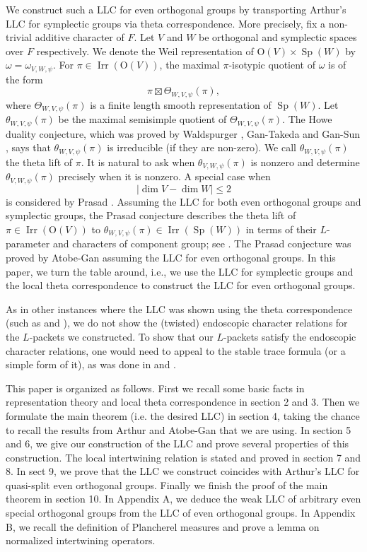 \documentclass[article]{article}
\numberwithin{equation}{section}
\theoremstyle{definition}
\DeclareMathOperator{\SP}{Sp}
\DeclareMathOperator{\Irr}{Irr}
\begin{document}
We construct such a LLC for even orthogonal groups by transporting Arthur's LLC for symplectic groups via theta correspondence. More precisely, fix a non-trivial additive character of $F$. Let $V$ and $W$ be orthogonal and symplectic spaces over $F$ respectively. We denote the Weil representation of $\mathrm O(V)\times \SP(W)$ by $\omega=\omega_{V,W,\psi}$. For $\pi\in 
\Irr(\mathrm O(V))$, the maximal $\pi$-isotypic quotient of $\omega$ is of the form
$$\pi \boxtimes \Theta_{W,V,\psi}(\pi),$$
where $\Theta_{W,V,\psi}(\pi)$ is a finite length smooth representation of $\SP(W)$. Let $\theta_{W,V, \psi}(\pi)$ be the maximal semisimple quotient of $\Theta_{W,V, \psi}(\pi)$. The Howe duality conjecture, which was proved by Waldspurger \cite{MR1159105}, Gan-Takeda \cite{ MR3454380} and Gan-Sun \cite{MR3753911}, says that $\theta_{W, V,  \psi}(\pi)$ is irreducible (if they are
non-zero). We call $\theta_{W,V,\psi}(\pi)$ the theta lift of $\pi$. It is natural to ask when $\theta_{V,W,\psi}(\pi)$ is nonzero and determine $\theta_{V,W,\psi}(\pi)$ precisely when it is nonzero. A special case when $$|\dim V-\dim W|\leq 2$$ is considered by Prasad \cite{MR1248702}. Assuming the LLC for both even orthogonal groups and symplectic groups, the Prasad conjecture describes the theta lift of $\pi\in \Irr(\mathrm O(V))$ to $\theta_{ W,V,\psi}(\pi)\in \Irr(\SP(W))$ in terms of their $L$-parameter and characters of component group; see \cite[\S 4]{MR3708200}. The Prasad conjecture was proved by Atobe-Gan \cite{MR3708200} assuming the LLC for even orthogonal groups. In this paper, we turn the table around, i.e., we use the LLC for symplectic groups and the local theta correspondence to construct the LLC for even orthogonal groups. 

As in other instances where the LLC was shown using the theta correspondence (such as \cite{MR2999299} and \cite{MR2800725}), 
we do not show the (twisted) endoscopic character relations for the $L$-packets we constructed. To show that our $L$-packets satisfy the endoscopic character relations, one would need to appeal to the stable trace formula (or a simple form of it), as was done in \cite{MR3267112} and \cite{luo2020endoscopic}. 

 
This paper is organized as follows. First we recall some basic facts in representation theory and local theta correspondence in section 2 and 3. Then we formulate the main theorem (i.e. the desired LLC) in section 4, taking the chance to recall the results from Arthur \cite{MR3135650} and Atobe-Gan \cite{MR3708200} that we are using. In section 5 and 6, we give our construction of the LLC and prove several properties of this construction. The local intertwining relation is stated and proved in section 7 and 8. In sect 9, we prove that the LLC we construct coincides with Arthur's LLC for quasi-split even orthogonal groups. Finally we finish the proof of the main theorem in section 10. In Appendix A, we deduce the weak LLC of arbitrary even special orthogonal groups from the LLC of even orthogonal groups. In Appendix B, we recall the definition of Plancherel measures and prove a lemma on normalized intertwining operators. 
\end{document}
